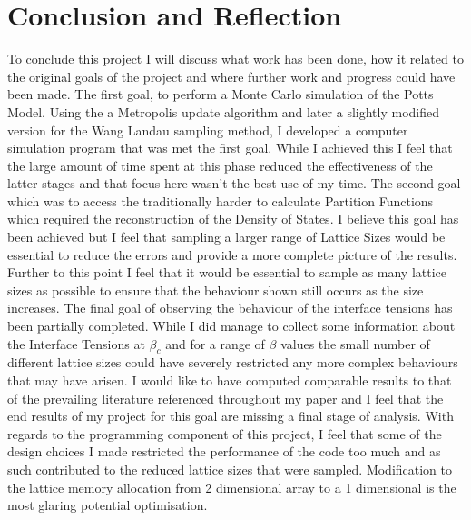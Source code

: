 \chapter{Conclusion and Reflection}
To conclude this project I will discuss what work has been done, how it related to the original goals of the project and where further work and progress could have been made.
The first goal, to perform a Monte Carlo simulation of the Potts Model. 
Using the a Metropolis update algorithm and later a slightly modified version for the Wang Landau sampling method, I developed a computer simulation program that was met the first goal. 
While I achieved this I feel that the large amount of time spent at this phase reduced the effectiveness of the latter stages and that focus here wasn't the best use of my time.
The second goal which was to access the traditionally harder to calculate Partition Functions which required the reconstruction of the Density of States.
I believe this goal has been achieved but I feel that sampling a larger range of Lattice Sizes would be essential to reduce the errors and provide a more complete picture of the results.
Further to this point I feel that it would be essential to sample as many lattice sizes as possible to ensure that the behaviour shown still occurs as the size increases.
The final goal of observing the behaviour of the interface tensions has been partially completed. 
While I did manage to collect some information about the Interface Tensions at $\beta_c$ and for a range of $\beta$ values the small number of different lattice sizes could have severely restricted any more complex behaviours that may have arisen.
I would like to have computed comparable results to that of the prevailing literature referenced throughout my paper and I feel that the end results of my project for this goal are missing a final stage of analysis.
With regards to the programming component of this project, I feel that some of the design choices I made restricted the performance of the code too much and as such contributed to the reduced lattice sizes that were sampled.
Modification to the lattice memory allocation from 2 dimensional array to a 1 dimensional is the most glaring potential optimisation.


